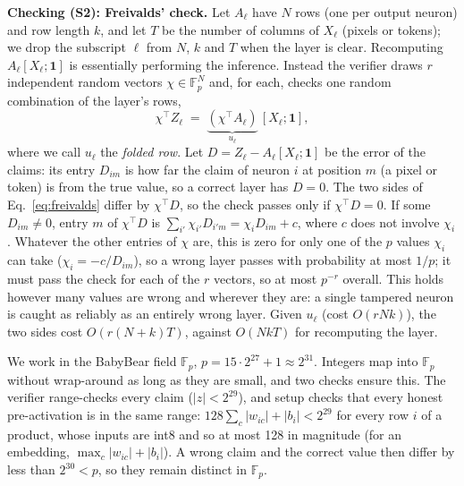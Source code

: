 \documentclass[sigconf,nonacm]{acmart}
\newcommand{\T}{\top}
\newcommand{\F}{\mathbb{F}_p}
\newcommand{\para}[1]{\par\noindent\textbf{#1}\quad}
\begin{document}
\para{Checking (S2): Freivalds' check.} Let $A_\ell$ have $N$ rows (one per output neuron) and row
length $k$, and let $T$ be the number of columns of $X_\ell$ (pixels or tokens); we drop the
subscript $\ell$ from $N$, $k$ and $T$ when the layer is clear. Recomputing $A_\ell[X_\ell;\mathbf
1]$ is essentially performing the inference. Instead the verifier draws $r$ independent random vectors
$\chi \in \F^{N}$ and, for each, checks one random combination of the layer's rows,
\begin{equation}
  \chi^\T Z_\ell \;=\; \underbrace{(\chi^\T A_\ell)}_{u_\ell}\,[X_\ell; \mathbf{1}] ,
  \label{eq:freivalds}
\end{equation}
where we call $u_\ell$ the \emph{folded row}. Let $D = Z_\ell - A_\ell [X_\ell; \mathbf{1}]$ be the
error of the claims: its entry $D_{im}$ is how far the claim of neuron $i$ at position $m$ (a pixel
or token) is from the true value, so a correct layer has $D = 0$. The two sides of
Eq.~\eqref{eq:freivalds} differ by $\chi^\T D$, so the check passes only if $\chi^\T D = 0$. If
some $D_{im} \ne 0$, entry $m$ of $\chi^\T D$ is $\sum_{i'} \chi_{i'} D_{i'm} = \chi_i D_{im} + c$,
where $c$ does not involve $\chi_i$. Whatever the other entries of $\chi$ are, this is zero for
only one of the $p$ values $\chi_i$ can take ($\chi_i = -c/D_{im}$), so a wrong layer passes with
probability at most $1/p$; it must pass the check for each of the $r$ vectors, so at most
$p^{-r}$ overall. This holds however many values are wrong and wherever they are: a
single tampered neuron is caught as reliably as an entirely wrong layer. Given $u_\ell$ (cost
$O(rNk)$), the two sides cost $O(r(N+k)T)$, against $O(NkT)$ for recomputing the layer.

We work in the BabyBear field $\F$, $p = 15\cdot2^{27}+1 \approx 2^{31}$. Integers map into $\F$
without wrap-around as long as they are small, and two checks ensure this. The verifier
range-checks every claim ($|z| < 2^{29}$), and setup checks that every honest pre-activation is
in the same range: $128\sum_c |w_{ic}| + |b_i| < 2^{29}$ for every row $i$ of a product, whose
inputs are int8 and so at most 128 in magnitude (for an embedding, $\max_c |w_{ic}| + |b_i|$). A wrong claim and the correct value then differ by less than
$2^{30} < p$, so they remain distinct in $\F$.
\end{document}
